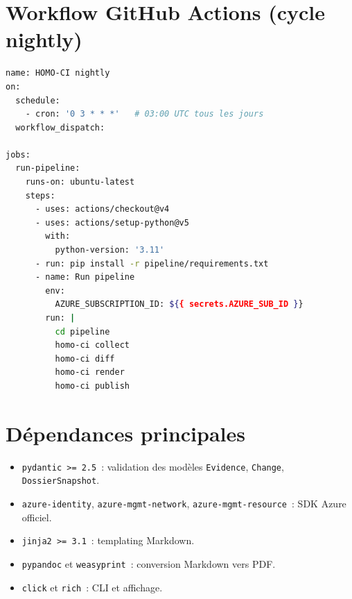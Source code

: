 \section{Workflow GitHub Actions (cycle nightly)}

\begin{lstlisting}[language=bash,caption={\texttt{.github/workflows/nightly.yml}
(extrait).}]
name: HOMO-CI nightly
on:
  schedule:
    - cron: '0 3 * * *'   # 03:00 UTC tous les jours
  workflow_dispatch:

jobs:
  run-pipeline:
    runs-on: ubuntu-latest
    steps:
      - uses: actions/checkout@v4
      - uses: actions/setup-python@v5
        with:
          python-version: '3.11'
      - run: pip install -r pipeline/requirements.txt
      - name: Run pipeline
        env:
          AZURE_SUBSCRIPTION_ID: ${{ secrets.AZURE_SUB_ID }}
        run: |
          cd pipeline
          homo-ci collect
          homo-ci diff
          homo-ci render
          homo-ci publish
\end{lstlisting}

\section{Dépendances principales}

\begin{itemize}
  \item \texttt{pydantic >= 2.5}~: validation des modèles
    \texttt{Evidence}, \texttt{Change}, \texttt{DossierSnapshot}.
  \item \texttt{azure-identity}, \texttt{azure-mgmt-network},
    \texttt{azure-mgmt-resource}~: SDK Azure officiel.
  \item \texttt{jinja2 >= 3.1}~: templating Markdown.
  \item \texttt{pypandoc} et \texttt{weasyprint}~: conversion
    Markdown vers PDF.
  \item \texttt{click} et \texttt{rich}~: CLI et affichage.
\end{itemize}
